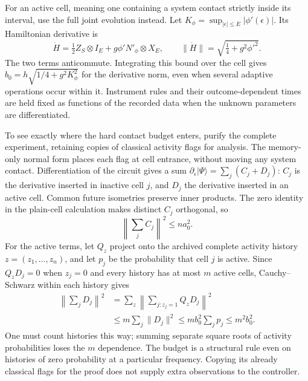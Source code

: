 \documentclass[11pt,a4paper]{article}
\numberwithin{equation}{section}
\theoremstyle{remark}
\begin{document}
For an active cell, meaning one containing a system contact strictly
inside its interval, use the full
joint evolution instead. Let $K_\phi=\sup_{|\epsilon|\le E}|\phi'(\epsilon)|$.
Its Hamiltonian derivative is
\begin{equation}
 \dot H=\tfrac12 Z_S\otimes I_E
          +g\phi' N'_\phi\otimes X_E,\qquad
 \|\dot H\|=\sqrt{\tfrac14+g^2\phi'^2}.
\end{equation}
The two terms anticommute. Integrating this bound over the cell gives
$b_0=h\sqrt{1/4+g^2K_\phi^2}$ for the derivative norm, even when several
adaptive operations occur within it. Instrument rules and their
outcome-dependent times are held fixed as functions of the recorded data
when the unknown parameters are differentiated.

To see exactly where the hard contact budget enters, purify the complete
experiment, retaining copies of classical activity flags for analysis.
The memory-only normal form places each flag at cell entrance, without
moving any system contact. Differentiation of the circuit gives a sum
$\partial_\epsilon|\Psi\rangle=\sum_j(C_j+D_j)$: $C_j$ is the derivative
inserted in inactive cell $j$, and $D_j$ the derivative inserted in an
active cell. Common future isometries preserve inner products. The
zero identity in the plain-cell calculation makes distinct $C_j$
orthogonal, so
\begin{equation}
 \left\|\sum_jC_j\right\|^2\le na_0^2.
\end{equation}
For the active terms, let $Q_z$ project onto the archived complete activity
history $z=(z_1,\ldots,z_n)$, and let $p_j$ be the probability that cell
$j$ is active. Since $Q_zD_j=0$ when $z_j=0$ and every history has at most
$m$ active cells, Cauchy--Schwarz within each history gives
\begin{align}
 \left\|\sum_jD_j\right\|^2
 &=\sum_z\left\|\sum_{j:z_j=1}Q_zD_j\right\|^2\nonumber\\
 &\le m\sum_j\|D_j\|^2
 \le mb_0^2\sum_jp_j\le m^2b_0^2.
 \label{con:historybound}
\end{align}
One must count histories this way; summing separate square roots of
activity probabilities loses the $m$ dependence. The budget is a
structural rule even on histories of zero probability at a particular
frequency. Copying its already classical flags for the proof does not
supply extra observations to the controller.
\end{document}
